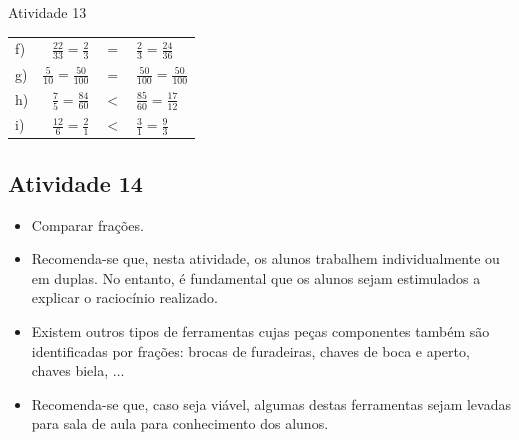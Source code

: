 \begin{multicols}{2}
\begin{resposta*}{Atividade 13}
\begin{tabular}{lrcl}
       f) &  $\frac{22}{33} = \frac{2}{3}$ &   $=$  &  $\frac{2}{3} = 
\frac{24}{36}$ \\
     
       g) &  $\frac{5}{10} = \frac{50}{100}$ &   $=$  &  $\frac{50}{100} = 
\frac{50}{100}$ \\
     
       h) &  $\frac{7}{5} = \frac{84}{60}$ &   $<$  &  $\frac{85}{60} = 
\frac{17}{12}$ \\
     
       i) &  $\frac{12}{6} = \frac{2}{1}$ &   $<$  &  $\frac{3}{1} = 
\frac{9}{3}$ \\
      
    \end{tabular}
\end{resposta*}

\clearpage

\subsection{Atividade 14}

\begin{itemize} %
    \item       Comparar frações.
\end{itemize} %
  
  
 
\begin{itemize} %
    \item       Recomenda-se que, nesta atividade, os alunos trabalhem 
individualmente ou em duplas. No entanto, é fundamental que os alunos sejam 
estimulados a explicar o raciocínio realizado.
    \item       Existem outros tipos de ferramentas cujas peças componentes 
também são identificadas por frações: brocas de furadeiras, chaves de boca e 
aperto, chaves biela,       $\ldots$
    \item       Recomenda-se que, caso seja viável, algumas destas ferramentas 
sejam levadas para sala de aula para conhecimento dos alunos.
\end{itemize} %
  
  
   \vspace{.1cm}
  
 \vspace{.1cm}
   

\end{multicols}
